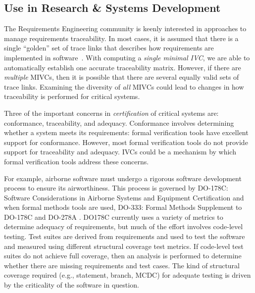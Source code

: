 \subsection{Use in Research \& Systems Development}
The Requirements Engineering community is keenly interested in approaches to manage requirements traceability.  In most cases, it is assumed that there is a single ``golden'' set of trace links that describes how requirements are implemented in software~\cite{COEST,hayes2003improving,cleland2007best}.
With computing a \emph{single minimal IVC}, we are able to automatically establish one accurate traceability matrix. However, if there are \emph{multiple} MIVCs, then it is possible that there are several equally valid sets of trace links.  Examining the diversity of \emph{all }MIVCs could lead to changes in how traceability is performed for critical systems.

Three of the important concerns in \emph{certification} of critical systems are: conformance, traceability, and adequacy.  Conformance involves determining whether a system meets its requirements: formal verification tools have excellent support for conformance.  However, most formal verification tools do not provide support for traceability and adequacy.  IVCs could be a mechanism by which formal verification tools address these concerns.

For example, airborne software must undergo a rigorous software development process to ensure its airworthiness. This process is governed by DO-178C: Software Considerations in Airborne Systems and Equipment Certification and when formal methods tools are used, DO-333: Formal Methods Supplement to DO-178C and DO-278A \cite{DO178C}.
DO178C currently uses a variety of metrics to determine adequacy of requirements, but much of the effort involves code-level testing.  Test suites are derived from requirements and used to test the software and measured using different structural coverage test metrics.  If code-level test suites do not achieve full coverage, then an analysis is performed to determine whether there are missing requirements and test cases.  The kind of structural coverage required (e.g., statement, branch, MCDC) for adequate testing is driven by the criticality of the software in question.

